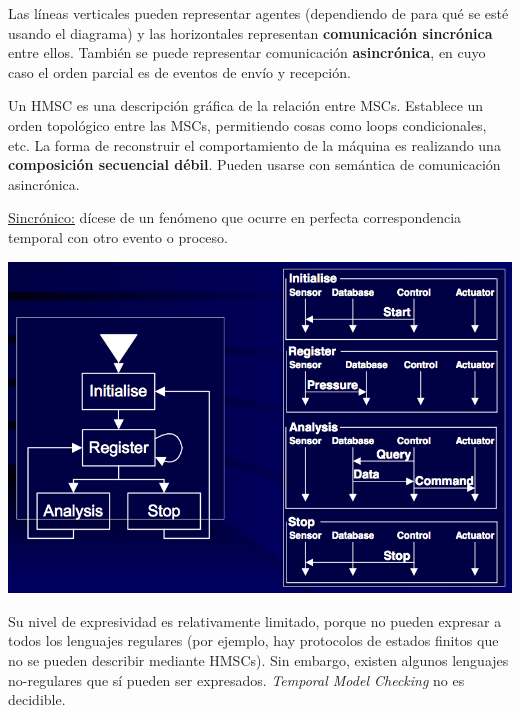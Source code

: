 \documentclass[]{article}
\begin{document}
Las líneas verticales pueden representar agentes (dependiendo de para qué se esté usando el diagrama) y las horizontales representan \textbf{comunicación sincrónica} entre ellos. También se puede representar comunicación \textbf{asincrónica}, en cuyo caso el orden parcial es de eventos de envío y recepción.

Un HMSC es una descripción gráfica de la relación entre MSCs. Establece un orden topológico entre las MSCs, permitiendo cosas como loops condicionales, etc. La forma de reconstruir el comportamiento de la máquina es realizando una \textbf{composición secuencial débil}. Pueden usarse con semántica de comunicación asincrónica.

\underline{Sincrónico:} dícese de un fenómeno que ocurre en perfecta correspondencia temporal con otro evento o proceso.

\begin{center}
	\includegraphics[scale=0.5]{hMSC.png}
\end{center}

Su nivel de expresividad es relativamente limitado, porque no pueden expresar a todos los lenguajes regulares (por ejemplo, hay protocolos de estados finitos que no se pueden describir mediante HMSCs). Sin embargo, existen algunos lenguajes no-regulares que sí pueden ser expresados. \textit{Temporal Model Checking} no es decidible.
\end{document}
